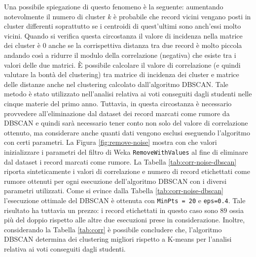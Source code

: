 \documentclass[12pt]{article}
\begin{document}
Una possibile spiegazione di questo fenomeno è la seguente: aumentando notevolmente il numero di cluster $k$ è probabile che record vicini vengano posti in cluster differenti soprattutto se i centroidi di quest'ultimi sono anch'essi molto vicini. Quando si verifica questa circostanza il valore di incidenza nella matrice dei cluster è $0$ anche se la corrispettiva distanza tra due record è molto piccola andando così a ridurre il modulo della correlazione (negativa) che esiste tra i valori delle due matrici. È possibile calcolare il valore di correlazione (e quindi valutare la bontà del clustering) tra matrice di incidenza dei cluster e matrice delle distanze anche nel clustering calcolato dall'algoritmo DBSCAN. Tale metodo è stato utilizzato nell'analisi relativa ai voti conseguiti dagli studenti nelle cinque materie del primo anno. Tuttavia, in questa circostanza è necessario provvedere all'eliminazione dal dataset dei record marcati come rumore da DBSCAN e quindi sarà necessario tener conto non solo del valore di correlazione ottenuto, ma considerare anche quanti dati vengono esclusi eseguendo l'algoritmo con certi parametri. La Figura \ref{fig:remove-noise} mostra con che valori inizializzare i parametri del filtro di Weka \texttt{RemoveWithValues} al fine di eliminare dal dataset i record marcati come rumore. La Tabella \ref{tab:corr-noise-dbscan} riporta sinteticamente i valori di correlazione e numero di record etichettati come rumore ottenuti per ogni esecuzione dell'algoritmo DBSCAN con i diversi parametri utilizzati. Come si evince dalla Tabella \ref{tab:corr-noise-dbscan} l'esecuzione ottimale del DBSCAN è ottenuta con \texttt{MinPts = 20} e \texttt{eps=0.4}. Tale risultato ha tuttavia un prezzo: i record etichettati in questo caso sono $89$ ossia più del doppio rispetto alle altre due esecuzioni prese in considerazione. Inoltre, considerando la Tabella \ref{tab:corr} è possibile concludere che, l'algoritmo DBSCAN determina dei clustering migliori rispetto a K-means per l'analisi relativa ai voti conseguiti dagli studenti.
\end{document}
